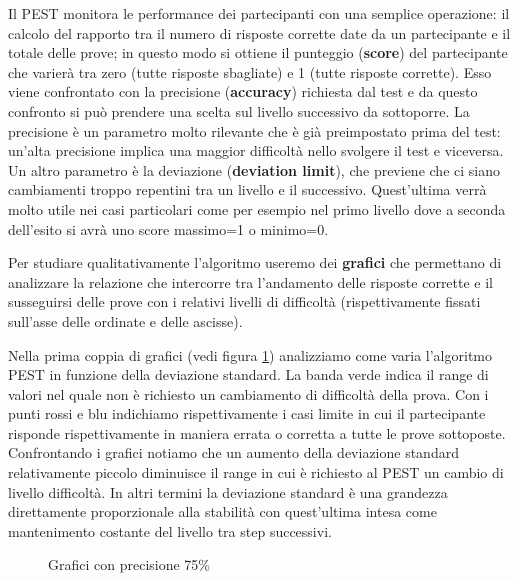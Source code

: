 \documentclass[
	corpo=12pt,
	twoside,
 	evenboxes,
	tipotesi=triennale,
    	stile=classica,
   	 greek,
]{toptesi}
\begin{document}
Il PEST monitora le performance dei partecipanti con una semplice operazione: il calcolo del rapporto tra il numero di risposte corrette date da un partecipante e il totale delle prove; in questo modo si ottiene il punteggio (\textbf{score}) del partecipante che varierà tra zero (tutte risposte sbagliate) e 1 (tutte risposte corrette). Esso viene confrontato con la precisione (\textbf{accuracy}) richiesta dal test e da questo confronto si può prendere una scelta sul livello successivo da sottoporre. La precisione è un parametro molto rilevante che è già preimpostato prima del test: un'alta precisione implica una maggior difficoltà nello svolgere il test e viceversa. Un altro parametro è la deviazione (\textbf{deviation limit}), che previene che ci siano cambiamenti troppo repentini tra un livello e il successivo. Quest'ultima verrà molto utile nei casi particolari come per esempio nel primo livello dove a seconda dell'esito si avrà uno score massimo=1 o minimo=0.

Per studiare qualitativamente l'algoritmo useremo dei \textbf{grafici} che permettano di analizzare la relazione che intercorre tra l'andamento delle risposte corrette e il susseguirsi delle prove con i relativi livelli di difficoltà (rispettivamente fissati sull'asse delle ordinate e delle ascisse).

Nella prima coppia di grafici (vedi figura \ref{fig:pest_acc75}) analizziamo come varia l'algoritmo PEST in funzione della deviazione standard. La banda verde indica il range di valori nel quale non è richiesto un cambiamento di difficoltà della prova. Con i punti rossi e blu indichiamo rispettivamente i casi limite in cui il partecipante risponde rispettivamente in maniera errata o corretta a tutte le prove sottoposte. Confrontando i grafici notiamo che un aumento della deviazione standard relativamente piccolo diminuisce il range in cui è richiesto al PEST un cambio di livello difficoltà. In altri termini la deviazione standard è una grandezza direttamente proporzionale alla stabilità con quest'ultima intesa come mantenimento costante del livello tra step successivi.

\begin{figure}[H]
\centering
{}
\caption{Grafici con precisione 75\%}
\label{fig:pest_acc75}
\end{figure}
\end{document}
